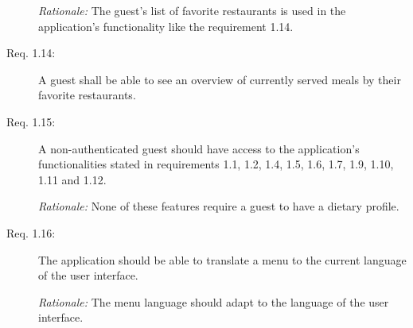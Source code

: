 \begin{description}
    \emph{Rationale:} The guest's list of favorite restaurants is used in the application's functionality like the requirement 1.14.
    \item [Req. 1.14:] A guest shall be able to see an overview of currently served meals by their favorite restaurants.
    \item [Req. 1.15:] A non-authenticated guest should have access to the application's functionalities stated in requirements 1.1, 1.2, 1.4, 1.5, 1.6, 1.7, 1.9, 1.10, 1.11 and 1.12. 
    
    \emph{Rationale:} None of these features require a guest to have a dietary profile.
    \item [Req. 1.16:] The application should be able to translate a menu to the current language of the user interface.

    \emph{Rationale:} The menu language should adapt to the language of the user interface.
\end{description}

